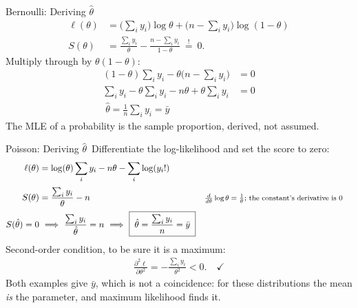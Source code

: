\documentclass[aspectratio=169,11pt,xcolor=dvipsnames]{beamer}
\newcommand{\loglik}{\ell}
\newcommand{\core}{\,\raisebox{0.6pt}{\textcolor{corestar}{$\bigstar$}}}
\begin{document}
\begin{frame}{Bernoulli: Deriving $\hat\theta$\core}
\begin{align*}
  \loglik(\theta) &= \Big(\textstyle\sum_i y_i\Big)\log\theta
   + \Big(n - \textstyle\sum_i y_i\Big)\log(1-\theta) \\[4pt]
  S(\theta) &= \frac{\sum_i y_i}{\theta} - \frac{n - \sum_i y_i}{1-\theta}
  \ \overset{!}{=}\ 0 .
\end{align*}
\pause
Multiply through by $\theta(1-\theta)$:
\begin{align*}
  (1-\theta)\sum_i y_i - \theta\Big(n - \sum_i y_i\Big) &= 0 \\
  \sum_i y_i - \theta\sum_i y_i - n\theta + \theta\sum_i y_i &= 0 \\
  \boxed{\;\hat\theta = \frac{1}{n}\sum_i y_i = \bar y\;}
\end{align*}
The MLE of a probability is the sample proportion, derived, not assumed.
\end{frame}

\begin{frame}{Poisson: Deriving $\hat\theta$\core}
Differentiate the log-likelihood and set the score to zero:
\begin{align*}
  \loglik(\theta) &= \log(\theta)\sum_i y_i - n\theta - \sum_i\log(y_i!) \\[2pt]
  S(\theta) &= \frac{\sum_i y_i}{\theta} - n
    && \text{\footnotesize $\tfrac{d}{d\theta}\log\theta = \tfrac1\theta$;
       the constant's derivative is $0$} \\[2pt]
  S(\hat\theta) = 0 &\ \Longrightarrow\ \frac{\sum_i y_i}{\hat\theta} = n
   \ \Longrightarrow\ \boxed{\;\hat\theta = \frac{\sum_i y_i}{n} = \bar y\;}
\end{align*}
\vskip2pt
Second-order condition, to be sure it is a maximum:
\begin{align*}
  \frac{\partial^2 \loglik}{\partial\theta^2} = -\frac{\sum_i y_i}{\theta^2} < 0 .
  \quad\checkmark
\end{align*}
\vskip2pt
Both examples give $\bar y$, which is not a coincidence: for these
distributions the mean \emph{is} the parameter, and maximum likelihood
finds it.
\end{frame}
\end{document}
